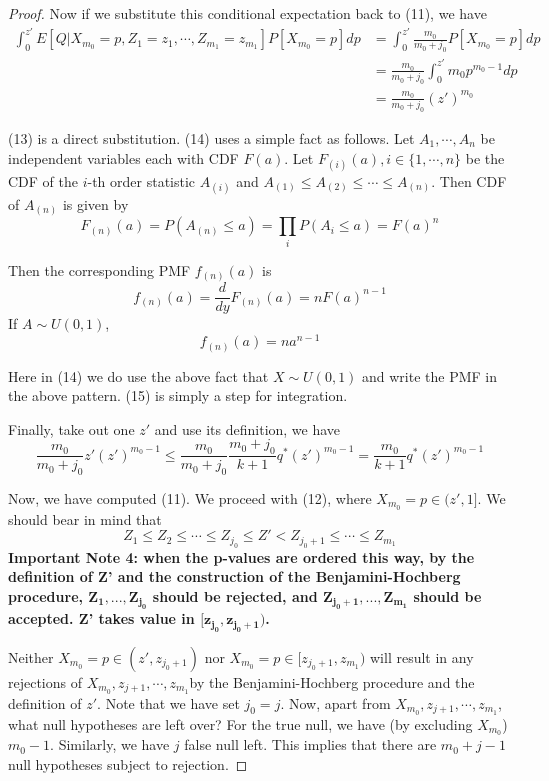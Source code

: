 \documentclass[12pt]{article}
\theoremstyle{plain}
\theoremstyle{definition}
\theoremstyle{remark}
\begin{document}
\begin{proof}
Now if we substitute this conditional expectation back to (11), we have
\begin{align}
    \int_0^{z'}E[Q|X_{m_0}=p,Z_1=z_1,\cdots,Z_{m_1}=z_{m_1}]P[X_{m_0}=p]dp 
    &=\int_0^{z'}\frac{m_0}{m_0+j_0}P[X_{m_0}=p]dp\\
    &=\frac{m_0}{m_0+j_0}\int_0^{z'}m_0p^{m_0-1}dp\\
    &=\frac{m_0}{m_0+j_0}(z')^{m_0}
\end{align}

(13) is a direct substitution. (14) uses a simple fact as follows. Let $A_1,\cdots,A_n$ be independent variables each with CDF $F(a)$. Let $F_{(i)}(a),i \in \{1,\cdots,n\}$ be the CDF of the $i$-th order statistic $A_{(i)}$ and $A_{(1)}\leq A_{(2)}\leq \cdots \leq A_{(n)}$. Then CDF of $A_{(n)}$ is given by \[
F_{(n)}(a)=P(A_{(n)}\leq a)=\prod_iP(A_i\leq a)=F(a)^n
\]

Then the corresponding PMF $f_{(n)}(a)$ is \[
f_{(n)}(a)=\frac{d}{dy}F_{(n)}(a)=nF(a)^{n-1}
\]
If $A\sim U(0,1)$,
\[ f_{(n)}(a)=na^{n-1}\]

Here in (14) we do use the above fact that $X\sim U(0,1)$ and write the PMF in the above pattern. (15) is simply a step for integration.

Finally, take out one $z'$ and use its definition, we have
\begin{equation}
 \frac{m_0}{m_0+j_0}z'(z')^{m_0-1}
\leq \frac{m_0}{m_0+j_0}\frac{m_0+j_0}{k+1}q^*(z')^{m_0-1}=\frac{m_0}{k+1}q^*(z')^{m_0-1}   
\end{equation}

Now, we have computed (11). We proceed with (12), where $X_{m_0}=p\in(z',1]$. We should bear in mind that \[
Z_1\leq Z_2 \leq \cdots \leq Z_{j_0} \leq Z' < Z_{j_0+1} \leq \cdots \leq Z_{m_1}
\]
\textbf{Important Note 4: when the p-values are ordered this way, by the definition of Z' and the construction of the Benjamini-Hochberg procedure, $\mathbf{Z_1,...,Z_{j_0}}$ should be rejected, and $\mathbf{Z_{j_0+1},...,Z_{m_1}}$ should be accepted. Z' takes value in $\mathbf{[z_{j_0},z_{j_0+1})}$. }

Neither $X_{m_0}=p\in(z',z_{j_0+1})$ nor $X_{m_0}=p\in[z_{j_0+1},z_{m_1})$ will result in any rejections of $X_{m_0}, z_{j+1},\cdots,z_{m_1} $by the Benjamini-Hochberg procedure and the definition of $z'$. Note that we have set $j_0=j$. Now, apart from $X_{m_0}, z_{j+1},\cdots,z_{m_1}$, what null hypotheses are left over? For the true null, we have (by excluding $X_{m_0}$) $m_0-1$. Similarly, we have $j$ false null left. This implies that there are $m_0+j-1$ null hypotheses subject to rejection.


\end{proof}
\end{document}
